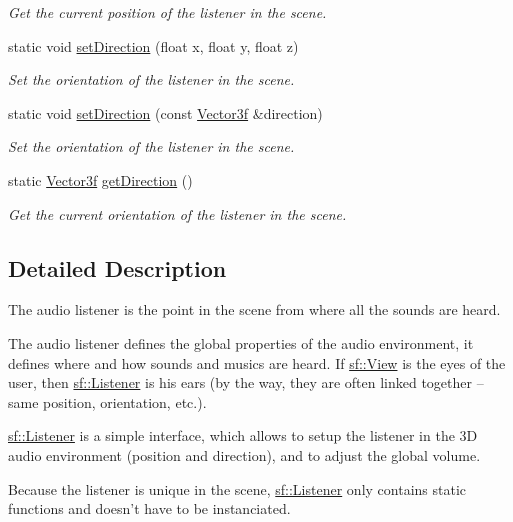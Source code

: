 \begin{DoxyCompactItemize}
\begin{DoxyCompactList}\small\item\em Get the current position of the listener in the scene. \end{DoxyCompactList}\item 
static void \hyperlink{classsf_1_1Listener_ae479dc15513c6557984d26e32d06d06e}{set\-Direction} (float x, float y, float z)
\begin{DoxyCompactList}\small\item\em Set the orientation of the listener in the scene. \end{DoxyCompactList}\item 
static void \hyperlink{classsf_1_1Listener_a1d99d9457c6ddad93449ecb4f504c2bf}{set\-Direction} (const \hyperlink{classsf_1_1Vector3}{Vector3f} \&direction)
\begin{DoxyCompactList}\small\item\em Set the orientation of the listener in the scene. \end{DoxyCompactList}\item 
static \hyperlink{classsf_1_1Vector3}{Vector3f} \hyperlink{classsf_1_1Listener_a54e91baba51d4431474f53ff7f9309f9}{get\-Direction} ()
\begin{DoxyCompactList}\small\item\em Get the current orientation of the listener in the scene. \end{DoxyCompactList}\end{DoxyCompactItemize}


\subsection{Detailed Description}
The audio listener is the point in the scene from where all the sounds are heard. 

The audio listener defines the global properties of the audio environment, it defines where and how sounds and musics are heard. If \hyperlink{classsf_1_1View}{sf\-::\-View} is the eyes of the user, then \hyperlink{classsf_1_1Listener}{sf\-::\-Listener} is his ears (by the way, they are often linked together -- same position, orientation, etc.).

\hyperlink{classsf_1_1Listener}{sf\-::\-Listener} is a simple interface, which allows to setup the listener in the 3\-D audio environment (position and direction), and to adjust the global volume.

Because the listener is unique in the scene, \hyperlink{classsf_1_1Listener}{sf\-::\-Listener} only contains static functions and doesn't have to be instanciated.

